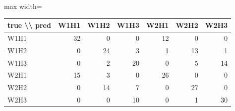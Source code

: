 \begin{adjustbox}{max width=\textwidth}
{\footnotesize
\begin{tabular}{lrrrrrr}
\toprule
\textbf{true \textbackslash{}\textbackslash{} pred} & \textbf{W1H1} & \textbf{W1H2} & \textbf{W1H3} & \textbf{W2H1} & \textbf{W2H2} & \textbf{W2H3} \\
\midrule
W1H1 & 32 & 0 & 0 & 12 & 0 & 0 \\
W1H2 & 0 & 24 & 3 & 1 & 13 & 1 \\
W1H3 & 0 & 2 & 20 & 0 & 5 & 14 \\
W2H1 & 15 & 3 & 0 & 26 & 0 & 0 \\
W2H2 & 0 & 14 & 7 & 0 & 27 & 0 \\
W2H3 & 0 & 0 & 10 & 0 & 1 & 30 \\
\bottomrule
\end{tabular}
}
\end{adjustbox}
